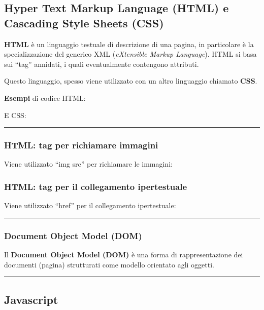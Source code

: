 \documentclass[a4paper]{article}
\newcommand{\longline}{\noindent\rule{\textwidth}{0.4pt}}
\newcommand{\dquotes}[1]{``#1''}
\begin{document}
	\subsection{Hyper Text Markup Language (HTML) e Cascading Style Sheets (CSS)}
	
	\textcolor{Red3}{\textbf{HTML}} è un linguaggio testuale di descrizione di una pagina, in particolare è la specializzazione del generico XML (\emph{eXtensible Markup Language}). HTML si basa sui \dquotes{tag} annidati, i quali eventualmente contengono attributi.\newline
	
	\noindent
	Questo linguaggio, spesso viene utilizzato con un altro linguaggio chiamato \textbf{CSS}.\newline
	
	\noindent
	\textcolor{Green4}{\textbf{Esempi}} di codice HTML:
	
	E CSS:
	
	
	\longline
	
	\subsubsection{HTML: tag per richiamare immagini}
	
	Viene utilizzato \dquotes{\textsf{img src}} per richiamare le immagini:
	\newpage
	
	\subsubsection{HTML: tag per il collegamento ipertestuale}
	
	Viene utilizzato \dquotes{\textsf{href}} per il collegamento ipertestuale:
	
	
	\longline
	
	\subsubsection{Document Object Model (DOM)}
	
	Il \textcolor{Red3}{\textbf{Document Object Model (DOM)}} è una forma di rappresentazione dei documenti (pagina) strutturati come modello orientato agli oggetti.
	
	\longline
	
	\subsection{Javascript}
	
\end{document}
